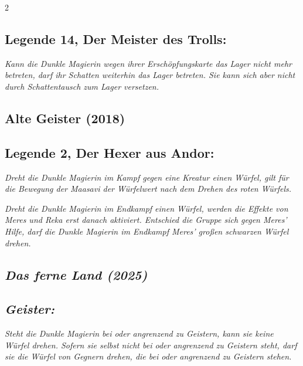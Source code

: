 \documentclass[10pt, a4paper, oneside]{book}
\newcommand{\fan}[1]{\textit{#1}}
\begin{document}
\begin{multicols*}{2}
\begin{bgcolor}
\subsection{Legende 14, Der Meister des Trolls:}

\fan{Kann die Dunkle Magierin wegen ihrer Erschöpfungskarte das Lager nicht mehr betreten, darf ihr Schatten weiterhin das Lager betreten. Sie kann sich aber nicht durch Schattentausch zum Lager versetzen.}
\supercite{40196}





\end{bgcolor}





\begin{bgcolor}[color-ag]
\section{Alte Geister (2018)}

\subsection{Legende 2, Der Hexer aus Andor:}

\fan{Dreht die Dunkle Magierin im Kampf gegen eine Kreatur einen Würfel, gilt für die Bewegung der Maasavi der Würfelwert nach dem Drehen des roten Würfels.}

\fan{Dreht die Dunkle Magierin im Endkampf einen Würfel, werden die Effekte von Meres und Reka erst danach aktiviert.  Entschied die Gruppe sich gegen Meres' Hilfe, darf die Dunkle Magierin im Endkampf Meres' großen schwarzen Würfel drehen.}

\end{bgcolor}




\begin{bgcolor}
\section{\fan{Das ferne Land (2025)}}

\subsection{\fan{Geister:}}

\fan{Steht die Dunkle Magierin bei oder angrenzend zu Geistern, kann sie keine Würfel drehen. Sofern sie selbst nicht bei oder angrenzend zu Geistern steht, darf sie die Würfel von Gegnern drehen, die bei oder angrenzend zu Geistern stehen.}

\end{bgcolor}


\end{multicols*}
\end{document}
